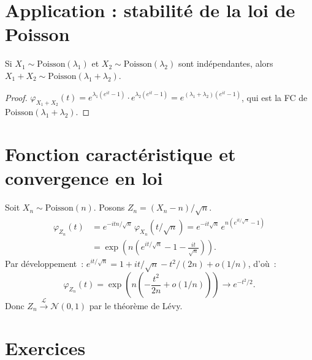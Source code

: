 \section{Application : stabilit\'e de la loi de Poisson}

\begin{proposition}
Si $X_1 \sim \text{Poisson}(\lambda_1)$ et $X_2 \sim \text{Poisson}(\lambda_2)$
sont ind\'ependantes, alors
$X_1 + X_2 \sim \text{Poisson}(\lambda_1 + \lambda_2)$.
\end{proposition}

\begin{proof}
$\varphi_{X_1+X_2}(t) = e^{\lambda_1(e^{it}-1)} \cdot e^{\lambda_2(e^{it}-1)}
= e^{(\lambda_1+\lambda_2)(e^{it}-1)}$, qui est la FC de
$\text{Poisson}(\lambda_1+\lambda_2)$.
\end{proof}

\section{Fonction caract\'eristique et convergence en loi}

\begin{exemple}
Soit $X_n \sim \text{Poisson}(n)$. Posons $Z_n = (X_n - n)/\sqrt{n}$.
\begin{align*}
    \varphi_{Z_n}(t) &= e^{-itn/\sqrt{n}}\, \varphi_{X_n}(t/\sqrt{n})
    = e^{-it\sqrt{n}}\, e^{n(e^{it/\sqrt{n}}-1)} \\
    &= \exp\!\left(n\!\left(e^{it/\sqrt{n}} - 1 - \frac{it}{\sqrt{n}}\right)\right).
\end{align*}
Par d\'eveloppement~: $e^{it/\sqrt{n}} = 1 + it/\sqrt{n} - t^2/(2n) + o(1/n)$, d'o\`u~:
\[
    \varphi_{Z_n}(t) = \exp\!\left(n\!\left(-\frac{t^2}{2n} + o(1/n)\right)\right)
    \to e^{-t^2/2}.
\]
Donc $Z_n \xrightarrow{\mathcal{L}} \mathcal{N}(0,1)$ par le th\'eor\`eme de L\'evy.
\end{exemple}

\section{Exercices}

